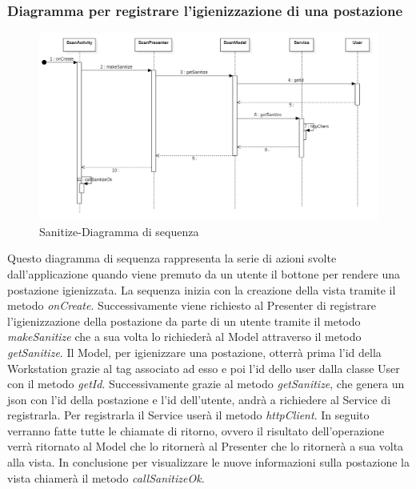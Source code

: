 \subsubsection{Diagramma per registrare l'igienizzazione di una postazione} 
\begin{figure}[H]
	\centering
	\includegraphics[width=16cm]{res/images/apputenti-mainSanitizeSeq.png}
	\caption{Sanitize-Diagramma di sequenza}
	\label{fig:Sanitize-Diagramma di sequenza}
\end{figure}
Questo diagramma di sequenza rappresenta la serie di azioni svolte dall'applicazione quando viene premuto da un utente il bottone per rendere una postazione igienizzata.
La sequenza inizia con la creazione della vista tramite il metodo \textit{onCreate}.
Successivamente viene richiesto al Presenter di registrare l'igienizzazione della postazione da parte di un utente tramite il metodo \textit{makeSanitize} che a sua volta lo richiederà al Model attraverso il metodo \textit{getSanitize}.
Il Model, per igienizzare una postazione, otterrà prima l'id della Workstation grazie al tag associato ad esso e poi l'id dello user dalla classe User con il metodo \textit{getId}.
Successivamente grazie al metodo \textit{getSanitize}, che genera un json con l'id della postazione e l'id dell'utente, andrà a richiedere al Service di registrarla. Per registrarla il Service userà il metodo \textit{httpClient}.
In seguito verranno fatte tutte le chiamate di ritorno, ovvero il risultato dell’operazione verrà ritornato al Model che lo ritornerà al Presenter che lo ritornerà a sua volta alla vista.
In conclusione per visualizzare le nuove informazioni sulla postazione la vista chiamerà il metodo \textit{callSanitizeOk}.

